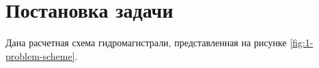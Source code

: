 \section{Постановка задачи}

Дана расчетная схема гидромагистрали, представленная на рисунке \ref{fig:1-problem-scheme}. 